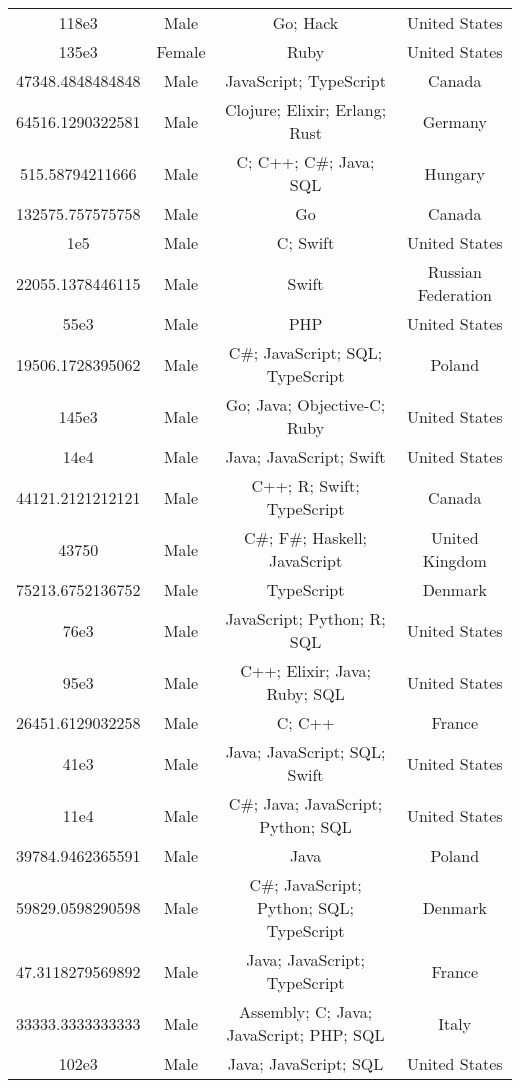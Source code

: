 \begin{center}
\begin{tabular}{ |c|c|c|c| }
118e3  &  Male  &  Go; Hack  &  United States  \\ 
135e3  &  Female  &  Ruby  &  United States  \\ 
47348.4848484848  &  Male  &  JavaScript; TypeScript  &  Canada  \\ 
64516.1290322581  &  Male  &  Clojure; Elixir; Erlang; Rust  &  Germany  \\ 
515.58794211666  &  Male  &  C; C++; C\#; Java; SQL  &  Hungary  \\ 
132575.757575758  &  Male  &  Go  &  Canada  \\ 
1e5  &  Male  &  C; Swift  &  United States  \\ 
22055.1378446115  &  Male  &  Swift  &  Russian Federation  \\ 
55e3  &  Male  &  PHP  &  United States  \\ 
19506.1728395062  &  Male  &  C\#; JavaScript; SQL; TypeScript  &  Poland  \\ 
145e3  &  Male  &  Go; Java; Objective-C; Ruby  &  United States  \\ 
14e4  &  Male  &  Java; JavaScript; Swift  &  United States  \\ 
44121.2121212121  &  Male  &  C++; R; Swift; TypeScript  &  Canada  \\ 
43750  &  Male  &  C\#; F\#; Haskell; JavaScript  &  United Kingdom  \\ 
75213.6752136752  &  Male  &  TypeScript  &  Denmark  \\ 
76e3  &  Male  &  JavaScript; Python; R; SQL  &  United States  \\ 
95e3  &  Male  &  C++; Elixir; Java; Ruby; SQL  &  United States  \\ 
26451.6129032258  &  Male  &  C; C++  &  France  \\ 
41e3  &  Male  &  Java; JavaScript; SQL; Swift  &  United States  \\ 
11e4  &  Male  &  C\#; Java; JavaScript; Python; SQL  &  United States  \\ 
39784.9462365591  &  Male  &  Java  &  Poland  \\ 
59829.0598290598  &  Male  &  C\#; JavaScript; Python; SQL; TypeScript  &  Denmark  \\ 
47.3118279569892  &  Male  &  Java; JavaScript; TypeScript  &  France  \\ 
33333.3333333333  &  Male  &  Assembly; C; Java; JavaScript; PHP; SQL  &  Italy  \\ 
102e3  &  Male  &  Java; JavaScript; SQL  &  United States  \\ 

\end{tabular}
\end{center}
